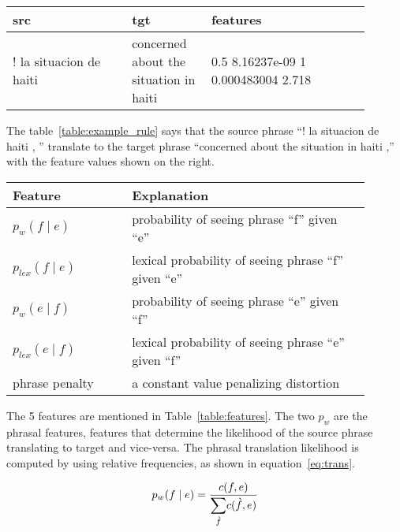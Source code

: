 \begin{table*}
\small
\small
\centering
\begin{tabular}{p{0.3\linewidth}p{0.2\linewidth}p{0.4\linewidth}}
\toprule
src & tgt & features \\
\toprule
! la situacion de haiti & concerned about the situation in haiti & 0.5 8.16237e-09 1 0.000483004 2.718 \\
\bottomrule
\end{tabular}
\caption{Example of a phrase pair in the Haitian Kreyol to English table}
\label{table:example_rule}
\end{table*}

The table~\ref{table:example_rule}  says that the source phrase ``! la situacion de haiti , '' translate to the target phrase ``concerned about the situation in haiti ,'' with the feature values shown on the right. 

\begin{table*}
	\small
	\small
	\begin{tabular}{p{0.3\linewidth}p{0.6\linewidth}}
	\toprule
	Feature &  Explanation \\
	\toprule
	$p_{w}(f \mid e)$ & probability of seeing phrase ``f'' given ``e'' \\
	$p_{lex}(f \mid e)$ & lexical probability of seeing phrase ``f'' given ``e'' \\
	$p_{w}(e \mid f)$ & probability of seeing phrase ``e'' given ``f'' \\
	$p_{lex}(e \mid f)$ & lexical probability of seeing phrase ``e'' given ``f'' \\
   	phrase penalty & a constant value penalizing distortion \\
	\bottomrule
	\end{tabular}
	\caption{Features of the phrase pairs, where ``f'' is foreign/source \& ``e'' is target/english}
	\label{table:features}
\end{table*}

The 5 features are mentioned in Table~\ref{table:features}. The two $p_{w}$ are the phrasal features, features that determine the likelihood of the source phrase translating to target and vice-versa. The phrasal translation likelihood is computed by using relative frequencies, as shown in equation~\eqref{eq:trans}.

\begin{equation} \label{eq:trans}
	p_{w}(f \mid e) = \frac{c(f, e)}{\mathlarger{\sum\limits_{\grave{f}}}c(\grave{f}, e)}
\end{equation}

